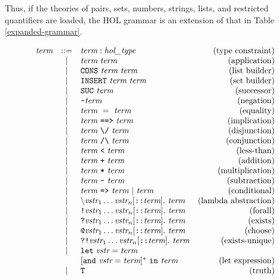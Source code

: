 \documentclass[12pt,fleqn,layout,a4paper]{report}
\makeatletter
\newcommand{\vstr}       {\mbox{\it vstr}}
\newcommand{\type}       {\mbox{\it hol\_type}}
\newcommand{\term}       {\mbox{\it term}}
\newcommand{\bs}         {\mbox{$\backslash$}}
\newcommand{\SUC}       {\mbox{\tt SUC}}
\newcommand{\CONS}       {\mbox{\tt CONS}}
\newcommand{\INSERT}    {\mbox{\tt INSERT}}
\newcommand{\IMP}       {\mbox{\tt ==>}}
\newcommand{\LET}       {\mbox{\tt let}}
\newcommand{\IN}       {\mbox{\tt in}}
\newcommand{\und}       {\mbox{\tt and}}
\newcommand{\ALL}       {\mbox{\tt !}}
\newcommand{\EXISTS}       {\mbox{\tt ?}}
\newcommand{\EXISTSONE}       {\mbox{\tt ?!}}
\newcommand{\CHOOSE}       {\mbox{\tt @}}
\makeatother
\begin{document}
Thus, if the theories of pairs, sets, numbers, strings, lists, and
restricted quantifiers are loaded, the HOL grammar is an extension of
that in Table \ref{expanded-grammar}.
 \begin{table}
 \[
 \begin{array}{rclr}
  \term & ::= & \term : \type & \mbox{(type constraint)} \\
  & | & \term\ \term & \mbox{(application)} \\
  & | & \CONS\ \term \ \term & \mbox{(list builder)} \\
  & | & \INSERT\ \term \ \term & \mbox{(set builder)} \\
  & | & \SUC\ \term & \mbox{(successor)} \\
  & | & \verb+~+ \term & \mbox{(negation)} \\
  & | & \term\ =\ \term & \mbox{(equality)} \\
  & | & \term\ \IMP\ \term & \mbox{(implication)} \\
  & | & \term\ \verb+\/+\ \term & \mbox{(disjunction)} \\
  & | & \term\ \verb+/\+\ \term & \mbox{(conjunction)} \\
  & | & \term\ \verb+<+ \ \term & \mbox{(less-than)} \\
  & | & \term\ \verb!+! \ \term & \mbox{(addition)} \\
  & | & \term\ \verb!*! \ \term & \mbox{(multiplication)} \\
  & | & \term\ \verb!-! \ \term & \mbox{(subtraction)} \\
  & | & \term\ \verb+=>+\ \term\ |\ \term & \mbox{(conditional)} \\
  & | & \bs\vstr_1\ldots\vstr_n[\verb+::+\term].\ \term & \mbox{(lambda abstraction)} \\
  & | & \ALL \vstr_1\ldots\vstr_n[\verb+::+\term].\ \term & \mbox{(forall)} \\
  & | & \EXISTS \vstr_1\ldots\vstr_n[\verb+::+\term].\ \term & \mbox{(exists)} \\
  & | & \CHOOSE \vstr_1\ldots\vstr_n[\verb+::+\term].\ \term & \mbox{(choose)} \\
  & | & \EXISTSONE \vstr_1\ldots\vstr_n[\verb+::+\term].\ \term &\mbox{(exists-unique)} \\
  & | & \LET\; \vstr = \term  & \\
  &   & [\und\ \vstr = \term]^{*}\ \IN\ \term & \mbox{(let expression)} \\
  & | & \verb+T+ & \mbox{(truth)} \\

\end{array}\]
\end{table}
\end{document}
